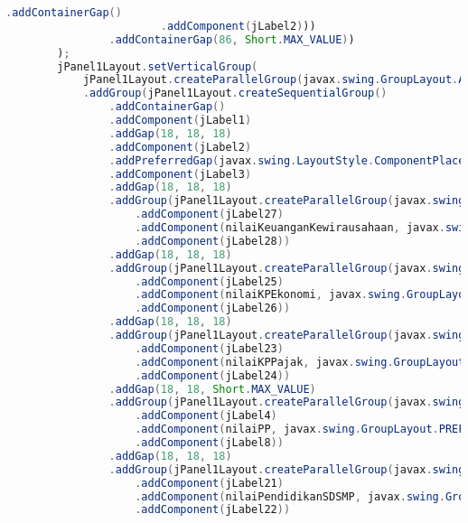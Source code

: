 \begin{lstlisting}[language=Java, caption=TampilanKondisiEksternal.java]
                        .addContainerGap()
                        .addComponent(jLabel2)))
                .addContainerGap(86, Short.MAX_VALUE))
        );
        jPanel1Layout.setVerticalGroup(
            jPanel1Layout.createParallelGroup(javax.swing.GroupLayout.Alignment.LEADING)
            .addGroup(jPanel1Layout.createSequentialGroup()
                .addContainerGap()
                .addComponent(jLabel1)
                .addGap(18, 18, 18)
                .addComponent(jLabel2)
                .addPreferredGap(javax.swing.LayoutStyle.ComponentPlacement.UNRELATED)
                .addComponent(jLabel3)
                .addGap(18, 18, 18)
                .addGroup(jPanel1Layout.createParallelGroup(javax.swing.GroupLayout.Alignment.BASELINE)
                    .addComponent(jLabel27)
                    .addComponent(nilaiKeuanganKewirausahaan, javax.swing.GroupLayout.PREFERRED_SIZE, javax.swing.GroupLayout.DEFAULT_SIZE, javax.swing.GroupLayout.PREFERRED_SIZE)
                    .addComponent(jLabel28))
                .addGap(18, 18, 18)
                .addGroup(jPanel1Layout.createParallelGroup(javax.swing.GroupLayout.Alignment.BASELINE)
                    .addComponent(jLabel25)
                    .addComponent(nilaiKPEkonomi, javax.swing.GroupLayout.PREFERRED_SIZE, javax.swing.GroupLayout.DEFAULT_SIZE, javax.swing.GroupLayout.PREFERRED_SIZE)
                    .addComponent(jLabel26))
                .addGap(18, 18, 18)
                .addGroup(jPanel1Layout.createParallelGroup(javax.swing.GroupLayout.Alignment.BASELINE)
                    .addComponent(jLabel23)
                    .addComponent(nilaiKPPajak, javax.swing.GroupLayout.PREFERRED_SIZE, javax.swing.GroupLayout.DEFAULT_SIZE, javax.swing.GroupLayout.PREFERRED_SIZE)
                    .addComponent(jLabel24))
                .addGap(18, 18, Short.MAX_VALUE)
                .addGroup(jPanel1Layout.createParallelGroup(javax.swing.GroupLayout.Alignment.BASELINE)
                    .addComponent(jLabel4)
                    .addComponent(nilaiPP, javax.swing.GroupLayout.PREFERRED_SIZE, javax.swing.GroupLayout.DEFAULT_SIZE, javax.swing.GroupLayout.PREFERRED_SIZE)
                    .addComponent(jLabel8))
                .addGap(18, 18, 18)
                .addGroup(jPanel1Layout.createParallelGroup(javax.swing.GroupLayout.Alignment.BASELINE)
                    .addComponent(jLabel21)
                    .addComponent(nilaiPendidikanSDSMP, javax.swing.GroupLayout.PREFERRED_SIZE, javax.swing.GroupLayout.DEFAULT_SIZE, javax.swing.GroupLayout.PREFERRED_SIZE)
                    .addComponent(jLabel22))

\end{lstlisting}
